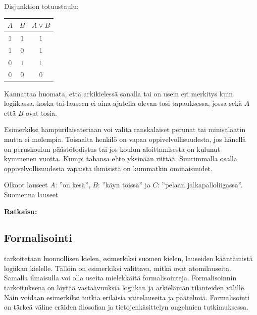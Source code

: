 Disjunktion totuustaulu:
 
\bigskip

\begin{center}
\begin{tabular}{|c|c|c|}\hline
$A$ & $B$ & $A\lor B$ \\ \hline
$1$ & $1$ & $1$\\ 
$1$ & $0$ & $1$\\
$0$ & $1$ & $1$\\
$0$ & $0$ & $0$\\ \hline
\end{tabular}
\end{center}

\bigskip

Kannattaa huomata, että arkikielessä sanalla tai on usein eri merkitys kuin logiikassa, koska tai-lauseen ei aina ajatella olevan tosi tapauksessa, jossa sekä $A$ että $B$ ovat tosia.

Esimerkiksi hampurilaisateriaan voi valita ranskalaiset perunat tai minisalaatin mutta ei molempia. Toisaalta henkilö on vapaa oppivelvollisuudesta, jos hänellä on peruskoulun päästötodistus tai jos koulun aloittamisesta on kulunut kymmenen vuotta. Kumpi tahansa ehto yksinään riittää. Suurimmalla osalla oppivelvollisuudesta vapaista ihmisistä on kummatkin ominaisuudet.

\begin{esimerkki}
Olkoot lauseet $A$: ''on kesä'', $B$: ''käyn töissä'' ja $C$: ''pelaan jalkapalloliigassa''. Suomenna lauseet

{\bf Ratkaisu:}
\end{esimerkki}


\subsection*{Formalisointi}
 tarkoitetaan luonnollisen kielen, esimerkiksi suomen kielen, lauseiden kääntämistä logiikan kielelle. Tällöin on esimerkiksi valittava, mitkä ovat atomilauseita. Samalla ilmaisulla voi olla useita mielekkäitä formalisointeja. Formalisoinnin tarkoituksena on löytää vastaavuuksia logiikan ja arkielämän tilanteiden välille. Näin voidaan esimerkiksi tutkia erilaisia väitelauseita ja päätelmiä. Formalisointi on tärkeä väline eräiden filosofian ja tietojenkäsittelyn ongelmien tutkimuksessa.

